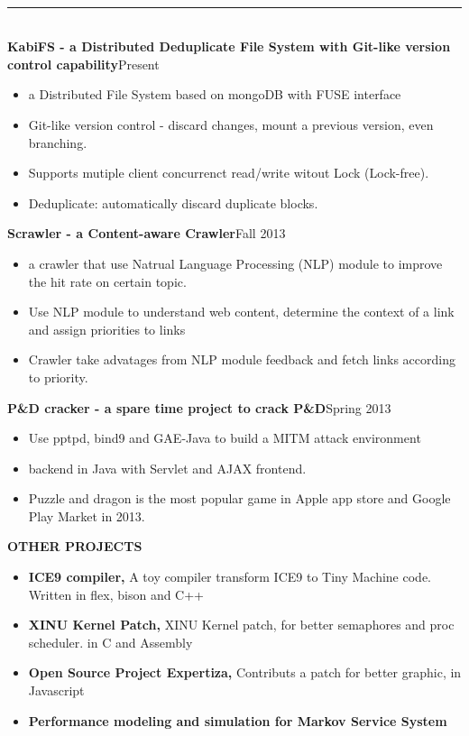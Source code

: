 \documentclass[10pt,oneside,letter,final]{article}
\newenvironment{CVsection}[1]{
    \hspace*{20pt}{\bf \Large #1}\\[-3pt]
    \rule[5pt]{\textwidth}{1pt}\\
}{
    \hspace{-10pt}\hfill\\[10pt]
}
\newenvironment{CVproject}[2]{
    {\bf #1}\hfill #2\\[2pt]
    \begin{itemize}
        \setlength{\parsep}{0pt}
        \setlength{\itemsep}{0pt}\vspace{-16pt}
}{
    \end{itemize}
}
\begin{document}
    \begin{CVsection}{\Large P\large ROJECTS}
        \begin{CVproject}{KabiFS - a Distributed Deduplicate File System with Git-like version control capability}{Present}
            \item a Distributed File System based on mongoDB with FUSE interface
            \item Git-like version control - discard changes, mount a previous version, even branching.
            \item Supports mutiple client concurrenct read/write witout Lock (Lock-free).
            \item Deduplicate: automatically discard duplicate blocks.
        \end{CVproject}
        
        \begin{CVproject}{Scrawler - a Content-aware Crawler}{Fall 2013}
            \item a crawler that use Natrual Language Processing (NLP) module to improve the hit rate on certain topic.
            \item Use NLP module to understand web content, determine the context of a link and  assign priorities to links
            \item Crawler take advatages from NLP module feedback and fetch links according to priority.
        \end{CVproject}
        
        \begin{CVproject}{P\&D cracker - a spare time project to crack P\&D}{Spring 2013}
            \item Use pptpd, bind9 and GAE-Java to build a MITM attack environment
            \item backend in Java with Servlet and AJAX frontend.
            \item Puzzle and dragon is the most popular game in Apple app store and Google Play Market in 2013.
        \end{CVproject}
        
        \begin{CVproject}{OTHER PROJECTS}{}
            \item {\bf ICE9 compiler,} A toy compiler transform ICE9 to Tiny Machine code. Written in flex, bison and C++
            \item {\bf XINU Kernel Patch,} XINU Kernel patch, for better semaphores and proc scheduler. in C and Assembly
            \item {\bf Open Source Project Expertiza,} Contributs a patch for better graphic, in Javascript
            \item {\bf {Performance modeling and simulation for Markov Service System}}
        \end{CVproject}
    \end{CVsection}
\end{document}
